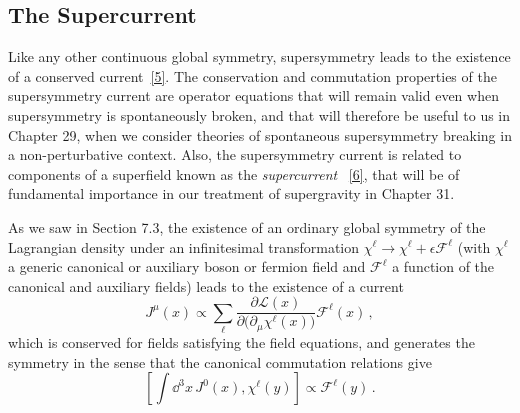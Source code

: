 
\subsection{The Supercurrent}

\providecommand{\SuperQ}{\mathcal{Q}}

Like any other continuous global symmetry, supersymmetry leads to the
existence of a conserved current~\hyperref[ch26-ref-5]{[5]}. The conservation
and commutation properties of the supersymmetry current are operator
equations that will remain valid even when supersymmetry is spontaneously
broken, and that will therefore be useful to us in Chapter 29, when we
consider theories of spontaneous supersymmetry breaking in a
non-perturbative context. Also, the supersymmetry current is related to
components of a superfield known as the \emph{supercurrent}%
~\hyperref[ch26-ref-6]{[6]}, that will be of fundamental importance in our
treatment of supergravity in Chapter 31.

As we saw in Section 7.3, the existence of an ordinary global symmetry of the
Lagrangian density under an infinitesimal transformation
\(\chi^\ell\longrightarrow\chi^\ell+\epsilon\mathcal{F}^\ell\) (with
\(\chi^\ell\) a generic canonical or auxiliary boson or fermion field and
\(\mathcal{F}^\ell\) a function of the canonical and auxiliary fields) leads
to the existence of a current
\[
  J^\mu(x)\propto
  \sum_\ell
  \frac{\partial\mathcal{L}(x)}
       {\partial\bigl(\partial_\mu\chi^\ell(x)\bigr)}
  \mathcal{F}^\ell(x)\,,
\]
which is conserved for fields satisfying the field equations, and generates
the symmetry in the sense that the canonical commutation relations give
\[
  \left[
    \int \dd^3x\,J^0(x),\chi^\ell(y)
  \right]
  \propto\mathcal{F}^\ell(y)\,.
\]

